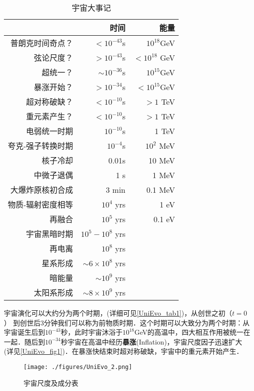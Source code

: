 \begin{table}[ht]
\centering
\caption{宇宙大事记}\label{UniEvo_tab1}
\begin{tabular}{|r|r|r|}
\hline
 & 时间 & 能量 \\
\hline
普朗克时间奇点？ & $<10^{-43}$s & $10^{18}$GeV \\
\hline
弦论尺度？       & $>10^{-43}$s & $<10^{18}$ GeV \\
\hline
超统一？         & $\sim 10^{-36}$s & $10^{15}$GeV \\
\hline
暴涨开始？       & $>10^{-34}$s & $<10^{15} $GeV \\
\hline
超对称破缺？     & $<10^{-10}$s & $>1$ TeV \\
\hline
重元素产生？     & $<10^{-10}$s & $>1$ TeV \\
\hline
电弱统一时期    & $10^{-10}$s & 1 TeV \\
\hline
夸克-强子转换时期 & $10^{-4}$s & $10^2$ MeV \\
\hline
核子冷却        & 0.01s & 10 MeV \\
\hline
中微子退偶      & 1 s  & 1 MeV \\
\hline
大爆炸原核初合成  & 3 min & 0.1 MeV \\
\hline
物质-辐射密度相等 & $10^4$ yrs  & 1 eV \\
\hline
再融合 & $10^5$ yrs  & 0.1 eV \\
\hline
宇宙黑暗时期 & $10^5 - 10^8$ yrs  &  \\
\hline
再电离 & $10^8$ yrs  &  \\
\hline
星系形成 & $\sim 6 \times 10^8$ yrs  &  \\
\hline
暗能量 & $\sim 10^9$  yrs  &  \\
\hline
太阳系形成 & $ \sim 8 \times 10^9  $ yrs  &  \\
\hline
\end{tabular}
\end{table}
宇宙演化可以大约分为两个时期，(详细可见\autoref{UniEvo_tab1})，从创世之初（$t=0$） 到创世后3分钟我们可以称为前物质时期．这个时期可以大致分为两个时期：从宇宙诞生后到$10^{-43}$秒，此时宇宙沐浴于$10^{18}$GeV的高温中，四大相互作用被统一在一起．随后到$10^{-34}$秒宇宙在高温中经历\textbf{暴涨}(Inflation)，宇宙尺度因子迅速扩大(详见\autoref{UniEvo_fig1})．在暴涨快结束时超对称破缺，宇宙中的重元素开始产生．

\begin{figure}[ht]
\centering
\texttt{[image: ./figures/UniEvo\_2.png]}
\caption{宇宙尺度及成分表} \label{UniEvo_fig1}
\end{figure}

